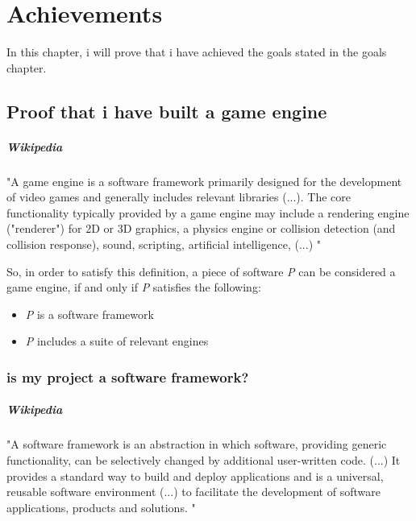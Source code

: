 \chapter{Achievements}

    In this chapter, i will prove that i have achieved the goals stated in the goals chapter.

    \section{Proof that i have built a game engine}
        \paragraph*{Wikipedia} "A game engine is a software framework primarily designed for the development of video games and generally includes relevant libraries
        (...).
        The core functionality typically provided by a game engine may include a rendering engine ("renderer") for 2D or 3D graphics, a physics engine or collision detection (and collision response), sound, scripting, artificial intelligence, 
        (...)
        "

        So, in order to satisfy this definition, a piece of software \emph{P} can be considered a game engine, if and only if \emph{P} satisfies the following:

        \begin{itemize}
            \item \emph{P} is a software framework
            \item \emph{P} includes a suite of relevant engines
        \end{itemize}

        \subsection{is my project a software framework?}

            \paragraph*{Wikipedia} "A software framework is an abstraction in which software, providing generic functionality, can be selectively changed by additional user-written code.
            (...)
            It provides a standard way to build and deploy applications and is a universal, reusable software environment 
            (...)
            to facilitate the development of software applications, products and solutions. "
            
